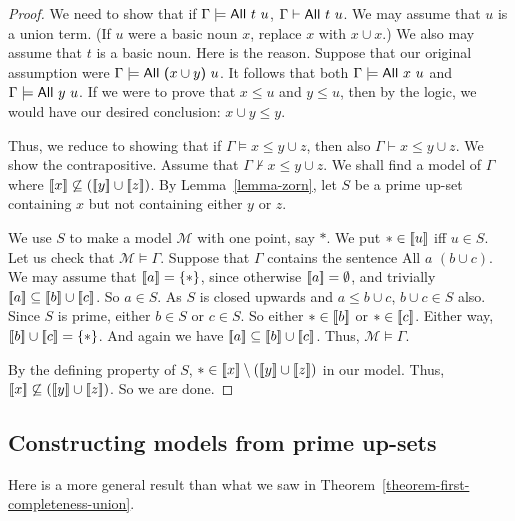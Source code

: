 \documentclass[12pt]{article}
\theoremstyle{definition}
\newcommand{\semantics}[1]{[\![\mbox{\em $ #1 $\/}]\!]}
\newcommand{\Model}{\mathcal{M}}
\newcommand{\set}[1]{\{ #1 \}}
\newcommand{\proves}{\vdash}
\begin{document}
\begin{proof}
We need to show that if $\Gamma\models \mbox{\sf All $t$ $u$}$,
$\Gamma\proves \mbox{\sf All $t$ $u$}$.
We may assume that $u$ is a union term.  (If $u$ were a basic noun $x$, replace $x$ with $x\cup x$.)
We also may assume that $t$ is a basic noun.   Here is the reason.   Suppose that our original assumption were
$\Gamma\models \mbox{\sf All ($x\cup y$) $u$}$.   It follows that both $\Gamma\models \mbox{\sf All $x$ $u$}$
and $\Gamma\models \mbox{\sf All $y$ $u$}$.   If we were to prove that $x \leq u$ and $y\leq u$, then by the logic,
we would have our desired conclusion:
$x\cup y \leq y$.

Thus, we reduce to showing that if  $\Gamma\models x\leq y \cup z$, then also  $\Gamma \proves x\leq y \cup z$.
We show the contrapositive.   Assume
 that $\Gamma\not\proves x\leq y \cup z$.   We shall find a model of $\Gamma$ where
$ \semantics{x} \not\subseteq (\semantics{y}\cup\semantics{z})$.
By Lemma~\ref{lemma-zorn}, let $S$ be a prime up-set containing $x$ but not containing either $y$ or $z$.

We use $S$ to make a model $\Model$ with one point, say $*$.   We put $*\in \semantics{u}$ iff $u\in S$.
Let us check that $\Model\models \Gamma$.  
Suppose that $\Gamma$ contains the sentence {\sf All $ a$ $(b\cup c)$.}    We may assume that $\semantics{a} = \set{*}$, 
since otherwise $\semantics{a} = \emptyset$, and trivially $\semantics{a}\subseteq \semantics{b}\cup\semantics{c}$.
So $a \in S$.  As $S$ is closed upwards and $a\leq b\cup c$, $b\cup c\in S$ also.   Since $S$ is prime, either $b\in S$ or $c\in S$.
So either $*\in\semantics{b}$ or $*\in \semantics{c}$.  Either way, $\semantics{b}\cup\semantics{c} = \set{*}$.  And again we have 
$\semantics{a}\subseteq \semantics{b}\cup\semantics{c}$.
Thus, $\Model\models \Gamma$.  

By the defining property of $S$, $*\in \semantics{x} \setminus (\semantics{y}\cup\semantics{z})$ in our model.   Thus, 
$ \semantics{x} \not\subseteq (\semantics{y}\cup\semantics{z})$.
So we are done.
\end{proof}

\subsection{Constructing models from prime up-sets}

Here is a more general result than what we saw in Theorem~\ref{theorem-first-completeness-union}.
\end{document}
